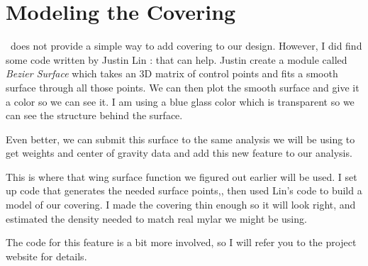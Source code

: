 \section{Modeling the Covering}

\osc\ does not provide a simple way to add covering to our design. However, I
did find some code written by Justin Lin :\cite{lin} that can help. Justin
create a module called {\it Bezier Surface} which takes an 3D matrix of control
points and fits a smooth surface through all those points. We can then plot the
smooth surface and give it a color so we can see it. I am using a blue glass
color which is transparent so we can see the structure behind the surface.

Even better, we can submit this surface to the same analysis we will be using to
get weights and center of gravity data and add this new feature to our
analysis.

This is where that wing surface function we figured out earlier  will be used.
I set up code that generates the needed surface points,, then used Lin's code to
build a model of our covering. I made the covering thin enough so it will look
right, and estimated the density needed to match real mylar we might be using.

The code for this feature is a bit more involved, so I will refer you to the
project website for details.


